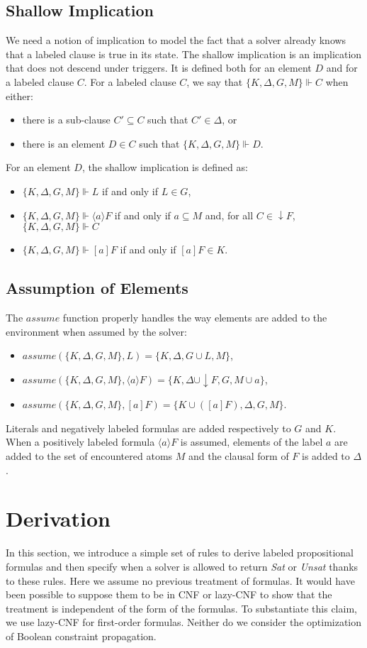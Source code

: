\documentclass[a4paper,11pt]{article}
\newcommand{\A}{\mathit{assume}}
\begin{document}
\subsection{Shallow Implication}
We need a notion of implication to model the fact that a solver already knows that a labeled clause
is true in its state. The shallow implication is an implication that does not descend
under triggers. It is defined both for an element $D$ and for a labeled clause $C$.
For a labeled clause $C$, we say that $\{K,\Delta,G,M\}\Vdash C$ when either:
\begin{itemize}
 \item there is a sub-clause $C'\subseteq C$ such that $C'\in\Delta$, or
 \item there is an element $D\in C$ such that $\{K,\Delta,G,M\}\Vdash D$.
\end{itemize}
For an element $D$, the shallow implication is defined as:
\begin{itemize}
 \item $\{K,\Delta,G,M\}\Vdash L$ if and only if $L\in G$,
 \item $\{K,\Delta,G,M\}\Vdash\langle a\rangle F$ if and only if $a\subseteq M$ and, 
for all $C\in\downarrow F$, $\{K,\Delta,G,M\}\Vdash C$ 
 \item $\{K,\Delta,G,M\}\Vdash[a]F$ if and only if $[a]F\in K$.
\end{itemize}
\subsection{Assumption of Elements}
The $\A$ function properly handles the way elements are added to the environment when assumed
by the solver:
\begin{itemize}
 \item $\A(\{K,\Delta,G,M\},L)=\{K,\Delta,G\cup L,M\}$,
 \item $\A(\{K,\Delta,G,M\},\langle a\rangle F)=\{K,\Delta\cup\downarrow F,G,M\cup a\}$,
 \item $\A(\{K,\Delta,G,M\},[a]F)=\{K\cup([a]F),\Delta,G,M\}$.
\end{itemize}
Literals and negatively labeled formulas are added respectively to $G$ and $K$. When a positively
labeled formula $\langle a\rangle F$ is assumed, elements of the label $a$ are added to the
set of encountered atoms $M$ and the clausal form of $F$ is added to $\Delta$.
\section{Derivation}
In this section, we introduce a simple set of rules to derive labeled propositional formulas and then
specify when a solver is allowed to return \emph{Sat} or \emph{Unsat} thanks to these rules.
Here we assume no previous treatment of formulas. It would have been possible to suppose them to be in
CNF or lazy-CNF to show that the treatment is independent of the form of the formulas. To substantiate
this claim, we use lazy-CNF for first-order formulas. Neither do we
consider the optimization of Boolean constraint propagation.
\end{document}
